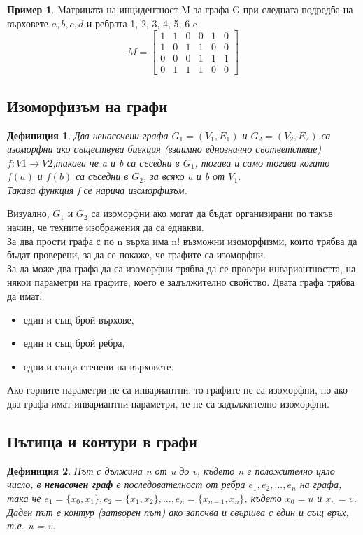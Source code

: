 \documentclass[fleqn, 12pt]{article}
\newtheorem{definition}{Дефиниция}[subsection]
\theoremstyle{definition}
\newtheorem{example}{Пример}[subsection]
\begin{document}
\begin{example}
Mатрицата на инцидентност M за графа G при следната подредба на върховете $a, b, c, d$ и ребрата 1, 2, 3, 4, 5, 6 e \\
$$
M = 
\begin{bmatrix}
1 & 1 & 0 & 0 & 1 & 0\\
1 & 0 & 1 & 1 & 0 & 0\\
0 & 0 & 0 & 1 & 1 & 1\\
0 & 1 & 1 & 1 &0 & 0
\end{bmatrix}
$$
\end{example}

\subsection{Изоморфизъм на графи}
\begin{definition}
Два ненасочени графа $G_1= (V_1, E_1)$ и $G_2= (V_2, E_2)$ са изоморфни ако съществува биекция (взаимно еднозначно съответствие) $f:V1 \to V2$,такава че a и b са съседни в $G_1$, тогава и само тогава когато $f(a)$ и $f(b)$ са съседни в $G_2$, за всяко a и b от $V_1$. \\
Такава функция f се нарича изоморфизъм.
\end{definition}
Визуално, $G_1$ и $G_2$ са изоморфни ако могат да бъдат организирани по такъв начин, че техните изображения да са еднакви. \\
За два прости графа с по n върха има n! възможни изоморфизми, които трябва да бъдат проверени, за да се покаже, че графите са изоморфни.\\
За да може два графа да са изоморфни трябва да се провери инвариантността, на някои параметри на графите, което е задължително свойство. Двата графа трябва да имат:
\begin{itemize}
\item един и същ брой върхове,
\item един и същ брой ребра, 
\item едни и същи степени на върховете.
\end{itemize}
Ако  горните параметри не са инвариантни, то графите не са изоморфни, но ако два графа имат инвариантни параметри, те не са задължително изоморфни.

\subsection{Пътища и контури в графи}
\begin{definition}
Път с дължина n от u до v, където n е положително цяло число, в \textbf{ненасочен граф} е последователност от ребра $e_1, e_2, ..., e_n$ на графа, така че $e_1= \{x_0, x_1\}, e_2= \{x_1, x_2\}, ..., e_n= \{x_{n-1}, x_n\}$, където $x_0= u$ и $x_n= v$.\\
Даден път е контур (затворен път) ако започва и свършва с един и същ връх, т.е. u = v. 
\end{definition}
\end{document}
